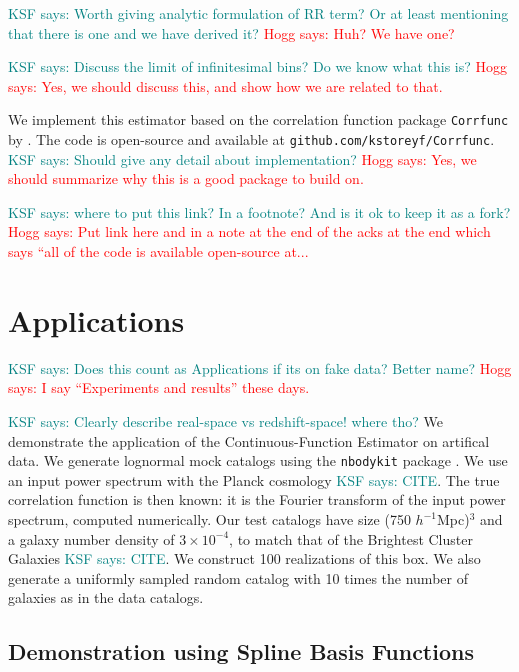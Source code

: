 \documentclass[modern]{aastex62}
\newcommand{\est}{the Continuous-Function Estimator\xspace}
\newcommand{\hmpc}{$h^{-1}$Mpc}
\newcommand{\KSF}[1]{\textcolor{teal}{KSF says: #1}}
\newcommand{\hogg}[1]{\textcolor{red}{Hogg says: #1}}
\begin{document}
\KSF{Worth giving analytic formulation of RR term? Or at least mentioning that there is one and we have derived it?} \hogg{Huh? We have one?}

\KSF{Discuss the limit of infinitesimal bins? Do we know what this is?} \hogg{Yes, we should discuss this, and show how we are related to that.}

We implement this estimator based on the correlation function package \texttt{Corrfunc} by \cite{Sinha2019}.
The code is open-source and available at \texttt{github.com/kstoreyf/Corrfunc}.
\KSF{Should give any detail about implementation?} \hogg{Yes, we should summarize why this is a good package to build on.}

\KSF{where to put this link? In a footnote? And is it ok to keep it as a fork?} \hogg{Put link here and in a note at the end of the acks at the end which says ``all of the code is available open-source at...}

\section{Applications}
\label{sec:app}

\KSF{Does this count as Applications if its on fake data? Better name?} \hogg{I say ``Experiments and results'' these days.}

\KSF{Clearly describe real-space vs redshift-space! where tho?}
We demonstrate the application of \est on artifical data.
We generate lognormal mock catalogs \citep{ColesJones1991} using the \texttt{nbodykit} package \citep{Hand2018}.
We use an input power spectrum with the Planck cosmology \KSF{CITE}.
The true correlation function is then known: it is the Fourier transform of the input power spectrum, computed numerically.
Our test catalogs have size (750 \hmpc)$^3$ and a galaxy number density of $3 \times 10^{-4}$, to match that of the Brightest Cluster Galaxies \KSF{CITE}.
We construct 100 realizations of this box. 
We also generate a uniformly sampled random catalog with 10 times the number of galaxies as in the data catalogs.

\subsection{Demonstration using Spline Basis Functions}
\label{sec:spline}
\end{document}
